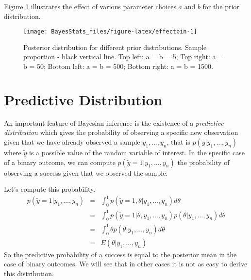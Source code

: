 \documentclass[
]{book}
\begin{document}
Figure \ref{fig:effectbin} illustrates the effect of various parameter choices \(a\) and \(b\) for the prior distribution.

\begin{figure}

{\centering \texttt{[image: BayesStats\_files/figure-latex/effectbin-1]} 

}

\caption{Posterior distribution for different prior distributions. Sample proportion - black vertical line. Top left: a = b = 5; Top right: a = b = 50; Bottom left: a = b = 500; Bottom right: a = b = 1500.}\label{fig:effectbin}
\end{figure}

\hypertarget{predictive-distribution}{%
\section{Predictive Distribution}\label{predictive-distribution}}

An important feature of Bayesian inference is the existence of a \emph{predictive distribution} which gives the probability of observing a specific new observation given that we have already observed a sample \(y_1,\dots,y_n\), that is \(p(\tilde{y}|y_1,\dots,y_n)\) where \(\tilde{y}\) is a possible value of the random variable of interest. In the specific case of a binary outcome, we can compute \(p(\tilde{y}=1|y_1,\dots,y_n)\) the probability of observing a success given that we observed the sample.

Let's compute this probability.
\begin{eqnarray*}
p(\tilde{y}=1|y_1,\dots,y_n)&=& \int_{0}^1p(\tilde{y}=1,\theta|y_1,\dots,y_n)d\theta\\
&=& \int_{0}^1p(\tilde{y}=1|\theta,y_1,\dots,y_n)p(\theta|y_1,\dots,y_n)d\theta\\
&=&\int_{0}^1\theta p(\theta|y_1,\dots,y_n)d\theta\\
&=& E(\theta|y_1,\dots,y_n)
\end{eqnarray*}
So the predictive probability of a success is equal to the posterior mean in the case of binary outcomes. We will see that in other cases it is not as easy to derive this distribution.

  
\end{document}
